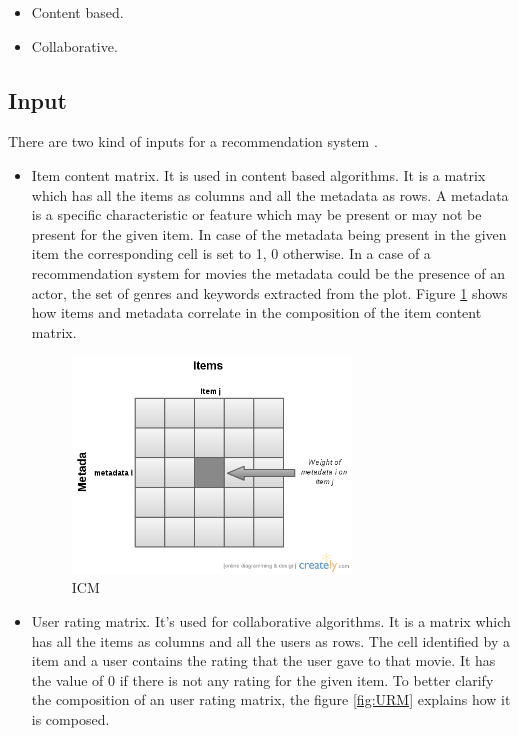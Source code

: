 \begin{itemize}
\item Content based.
\item Collaborative.
\end{itemize}

\subsection{Input}
\label{sec:Input}

There are two kind of inputs for a recommendation system \cite{thesis-andreia}. 
\begin{itemize}
\item Item content matrix. It is used in content based algorithms. It is a matrix which has all the items as columns and all the metadata as rows. A metadata is a specific characteristic or feature which may be present or may not be present for the given item. In case of the metadata being present in the given item the corresponding cell is set to 1, 0 otherwise. In a case of a recommendation system for movies the metadata could be the presence of an actor, the set of genres and keywords extracted from the plot. Figure \ref{fig:ICM} shows how items and metadata correlate in the composition of the item content matrix.

  \begin{figure}
    \centering
    \includegraphics[width=0.7\textwidth]{figures/ICM.png}
    \caption{ICM}
    \label{fig:ICM}
  \end{figure}
 
\item User rating matrix. It's used for collaborative algorithms. It is a matrix which has all the items as columns and all the users as rows. The cell identified by a item and a user contains the rating that the user gave to that movie. It has the value of 0 if there is not any rating for the given item. To better clarify the composition of an user rating matrix, the figure \ref{fig:URM} explains how it is composed.


\end{itemize}
